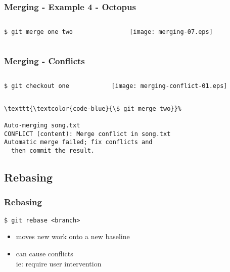\documentclass[english]{beamer}
\newcommand{\mysubsection}[2]{%
  \hypertarget{#2}{}%
  \subsection{#1}%
  \label{#2}%
}
\newcommand{\CMD}[1]{%
\texttt{\textcolor{code-blue}{#1}}%
}
\newcommand{\faint}[1]{%
\textcolor{code-gray}{#1}%
}
\newcommand{\red}[1]{%
\textcolor{code-red}{#1}%
}
\begin{document}
\begin{frame}
\frametitle{Merging - Example 4 - Octopus}

\begin{columns}[t]
        \begin{column}[T]{.5\textwidth}
                {\small
                \CMD{\$ git merge one two} \\
                }
        \end{column}
        \begin{column}[T]{.5\textwidth}
                \texttt{[image: merging-07.eps]}
        \end{column}
\end{columns}
\end{frame}

\begin{frame}[fragile]
\frametitle{Merging - Conflicts}

\begin{columns}[t]
        \begin{column}[T]{.5\textwidth}
                {\small
                \CMD{\$ git checkout one} \\
                }
        \end{column}
        \begin{column}[T]{.5\textwidth}
                \texttt{[image: merging-conflict-01.eps]}
        \end{column}
\end{columns}

\begin{Verbatim}[commandchars=\\\{\}]
\CMD{\$ git merge two}
Auto-merging song.txt
CONFLICT (content): Merge conflict in song.txt
Automatic merge failed; fix conflicts and
  then commit the result.
\end{Verbatim}

\end{frame}

\mysubsection{Rebasing}{using:rebasing}
\begin{frame}
\frametitle{Rebasing}

\CMD{\$ git rebase <branch>} \\
\begin{itemize}
        \item moves new work onto a new baseline
        \item can cause \red{conflicts} \\
                \faint{ie: require user intervention}
\end{itemize}
\end{frame}
\end{document}
